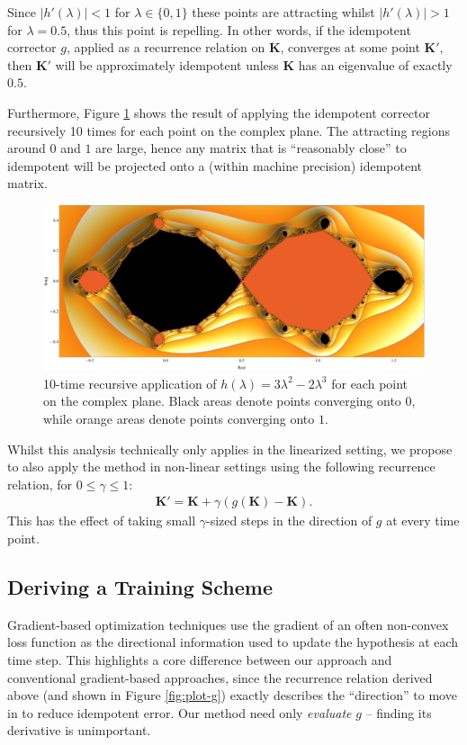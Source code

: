 \documentclass{article}
\theoremstyle{plain}
\theoremstyle{definition}
\theoremstyle{remark}
\newcommand{\vK}{\mathbf{K}}
\begin{document}
Since ${|h'(\lambda)| < 1}$ for ${\lambda \in \{0, 1\}}$ these points are attracting whilst ${|h'(\lambda)| > 1}$ for ${\lambda = 0.5}$, thus this point is repelling. In other words, if the idempotent corrector $g$, applied as a recurrence relation on $\vK$, converges at some point $\vK'$, then $\vK'$ will be approximately idempotent unless $\vK$ has an eigenvalue of exactly $0.5$.

Furthermore, Figure \ref{fig:fractal} shows the result of applying the idempotent corrector recursively 10 times for each point on the complex plane. The attracting regions around $0$ and $1$ are large, hence any matrix that is ``reasonably close'' to idempotent will be projected onto a (within machine precision) idempotent matrix.

\begin{figure}[!htp]
    \centering
    \includegraphics[width=\textwidth]{./resources/fractal.pdf}
    \caption{10-time recursive application of $h(\lambda) = 3\lambda^2 - 2\lambda^3$ for each point on the complex plane. Black areas denote points converging onto $0$, while orange areas denote points converging onto $1$.}
    \label{fig:fractal}
\end{figure}

Whilst this analysis technically only applies in the linearized setting, we propose to also apply the method in non-linear settings using the following recurrence relation, for ${0 \leq \gamma \leq 1}$:
%
\begin{align}
    \vK' = \vK + \gamma(g(\vK) - \vK).
\end{align}
%
This has the effect of taking small $\gamma$-sized steps in the direction of $g$ at every time point.

\subsection{Deriving a Training Scheme}
\label{sec:method-scheme}
Gradient-based optimization techniques use the gradient of an often non-convex loss function as the directional information used to update the hypothesis at each time step. This highlights a core difference between our approach and conventional gradient-based approaches, since the recurrence relation derived above (and shown in Figure \ref{fig:plot-g}) exactly describes the ``direction'' to move in to reduce idempotent error. Our method need only \textit{evaluate} $g$ -- finding its derivative is unimportant.
\end{document}

